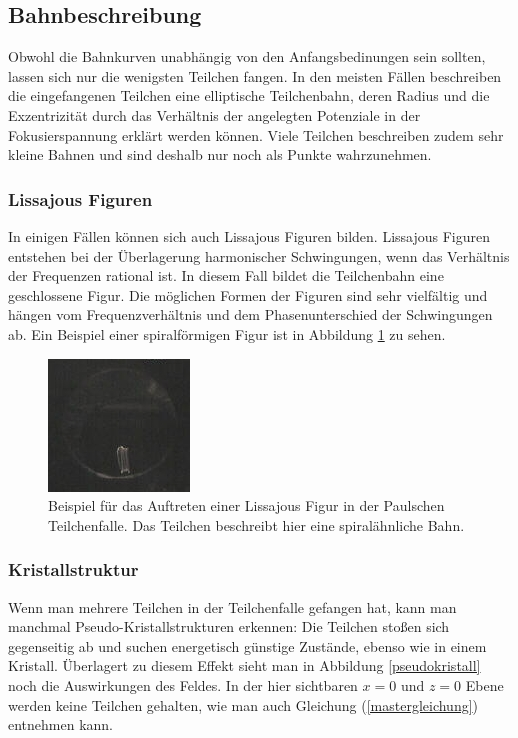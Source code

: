 \documentclass[a4paper,12pt]{article}
\begin{document}
\subsection{Bahnbeschreibung}
Obwohl die Bahnkurven unabhängig von den Anfangsbedinungen sein sollten, lassen sich nur die wenigsten Teilchen fangen.
In den meisten Fällen beschreiben die eingefangenen Teilchen eine elliptische Teilchenbahn, deren Radius und die Exzentrizität durch das Verhältnis der angelegten Potenziale 
in der Fokusierspannung erklärt werden können.
Viele Teilchen beschreiben zudem sehr kleine Bahnen und sind deshalb nur noch als Punkte wahrzunehmen.

\subsubsection*{Lissajous Figuren}
In einigen Fällen können sich auch Lissajous Figuren bilden. Lissajous Figuren entstehen bei der Überlagerung harmonischer Schwingungen, wenn das Verhältnis der Frequenzen rational ist.
In diesem Fall bildet die Teilchenbahn eine geschlossene Figur.
Die möglichen Formen der Figuren sind sehr vielfältig und hängen vom Frequenzverhältnis und dem Phasenunterschied der Schwingungen ab.
Ein Beispiel einer spiralförmigen Figur ist in Abbildung \ref{Lissjous} zu sehen.

\begin{figure}[htb]
		\centering
		\includegraphics{lisa_klein.jpg}
		\caption{Beispiel für das Auftreten einer Lissajous Figur in der Paulschen Teilchenfalle.
		Das Teilchen beschreibt hier eine spiralähnliche Bahn.}
		\label{Lissjous}
\end{figure}

\subsubsection*{Kristallstruktur}
Wenn man mehrere Teilchen in der Teilchenfalle gefangen hat, kann man manchmal Pseudo-Kristallstrukturen erkennen:
Die Teilchen stoßen sich gegenseitig ab und suchen energetisch günstige Zustände, ebenso wie in einem Kristall.
Überlagert zu diesem Effekt sieht man in Abbildung \ref{pseudokristall} noch die Auswirkungen des Feldes.
In der hier sichtbaren $x = 0$ und $z = 0$  Ebene werden keine Teilchen gehalten, wie man auch Gleichung (\ref{mastergleichung}) entnehmen kann.
\end{document}
